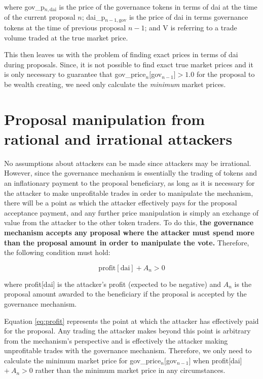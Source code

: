 \documentclass{article}
\begin{document}
where gov\_p$_{n,\mathrm{dai}}$ is the price of the governance tokens in terms of dai at the time of the current proposal $n$; dai\_p$_{n-1,\mathrm{gov}}$ is the price of dai in terms governance tokens at the time of previous proposal $n-1$; and V is referring to a trade volume traded at the true market price. 

This then leaves us with the problem of finding exact prices in terms of dai during proposals. Since, it is not possible to find exact true market prices and it is only necessary to guarantee that gov\_price$_{n}[$gov$_{n-1}] > 1.0$ for the proposal to be wealth creating, we need only calculate the \emph{minimum} market prices.
\section{Proposal manipulation from rational and irrational attackers}
No assumptions about attackers can be made since attackers may be irrational. However, since the governance mechanism is essentially the trading of tokens and an inflationary payment to the proposal beneficiary, as long as it is necessary for the attacker to make unprofitable trades in order to manipulate the mechanism, there will be a point as which the attacker effectively pays for the proposal acceptance payment, and any further price manipulation is simply an exchange of value from the attacker to the other token traders. To do this, \textbf{the governance mechanism accepts any proposal where the attacker must spend more than the proposal amount in order to manipulate the vote.} Therefore, the following condition must hold:

\begin{equation}
    \mathrm{profit[dai]} + A_n > 0 \label{eq:profit}
\end{equation}

where profit[dai] is the attacker's profit (expected to be negative) and $A_n$ is the proposal amount awarded to the beneficiary if the proposal is accepted by the governance mechanism.

Equation \ref{eq:profit} represents the point at which the attacker has effectively paid for the proposal. Any trading the attacker makes beyond this point is arbitrary from the mechanism's perspective and is effectively the attacker making unprofitable trades with the governance mechanism. Therefore, we only need to calculate the minimum market price for gov\_price$_{n}[$gov$_{n-1}]$ when profit[dai] $+\ A_n > 0$ rather than the minimum market price in any circumstances. 
\end{document}
